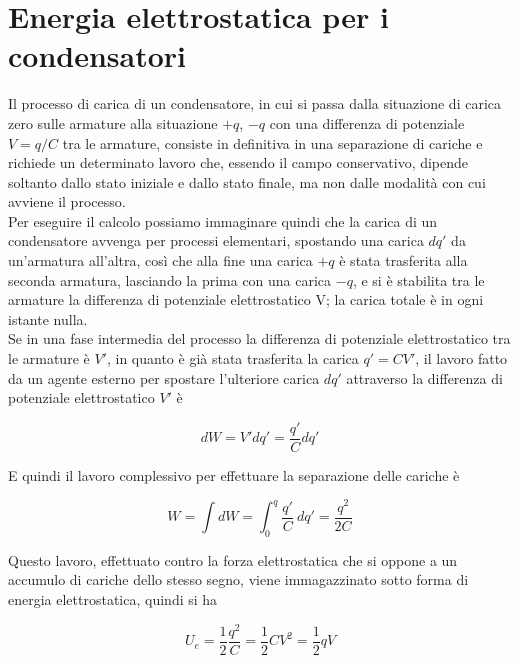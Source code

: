 \section{Energia elettrostatica per i condensatori}

Il processo di carica di un condensatore, in cui si passa dalla situazione di carica zero sulle armature alla situazione $+q$, $-q$ con una differenza di potenziale $V = q/C$ tra le armature, consiste in definitiva in una separazione di cariche e richiede un determinato lavoro che, essendo il campo conservativo, dipende soltanto dallo stato iniziale e dallo stato finale, ma non dalle modalità con cui avviene il processo. \\

Per eseguire il calcolo possiamo immaginare quindi che la carica di un condensatore avvenga per processi elementari, spostando una carica $dq'$ da un'armatura all'altra, così che alla fine una carica $+q$ è stata trasferita alla seconda armatura, lasciando la prima con una carica $ - q$, e si è stabilita tra le armature la differenza di potenziale elettrostatico V; la carica totale è in ogni istante nulla.\\

Se in una fase intermedia del processo la differenza di potenziale elettrostatico tra le armature è $V'$, in quanto è già stata trasferita la carica $q' = CV'$, il lavoro fatto da un agente esterno per spostare l'ulteriore carica $dq'$ attraverso la differenza di potenziale elettrostatico $V'$ è

\begin{equation}
    dW =  V' dq' = \frac{q'}{C} dq'
\end{equation}

E quindi il lavoro complessivo per effettuare la separazione delle cariche è 

\begin{equation}
    W = \int dW = \int_0 ^q \frac{q'}{C} \ dq' = \frac{q^2}{2C}
\end{equation}

Questo lavoro, effettuato contro la forza elettrostatica che si oppone a un accumulo di cariche dello stesso segno, viene immagazzinato sotto forma di energia elettrostatica, quindi si ha 

\begin{tcolorbox}[colback=yellow!10!white, colframe=orange!70!black, boxrule=0.8pt]
\begin{equation}
    U_e = \frac{1}{2} \frac{q^2}{C} = \frac{1}{2} CV^2 = \frac{1}{2} q V
\end{equation}
\end{tcolorbox}


